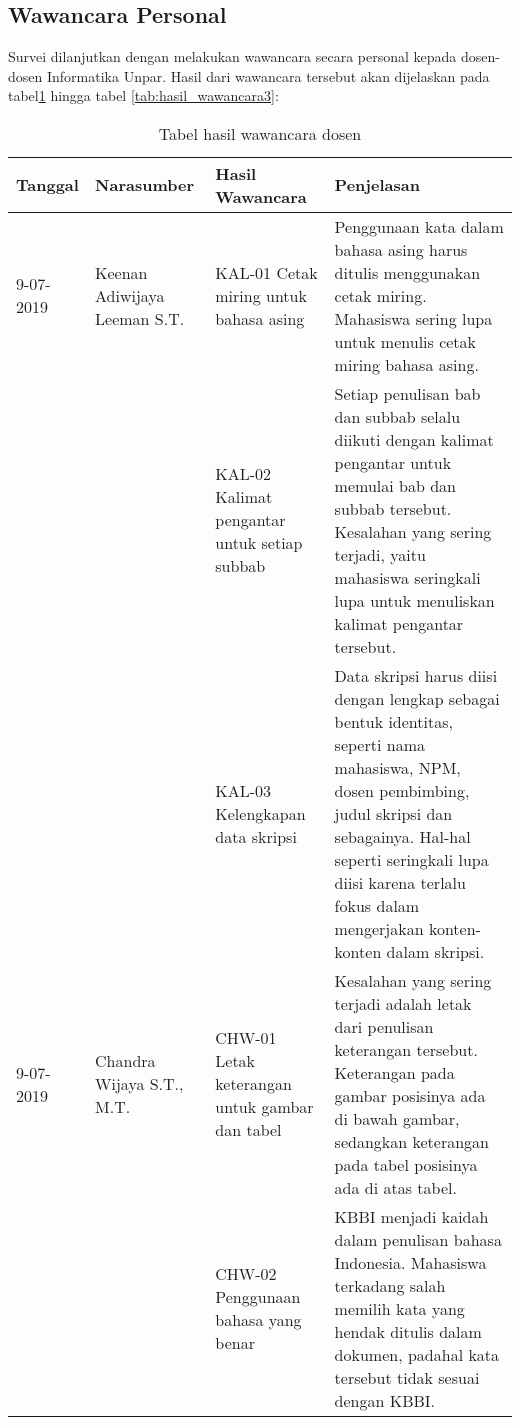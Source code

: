 \subsection{Wawancara Personal}
Survei dilanjutkan dengan melakukan wawancara secara personal kepada dosen-dosen Informatika Unpar. Hasil dari wawancara tersebut akan dijelaskan pada tabel\ref{tab:hasil_wawancara1} hingga tabel \ref{tab:hasil_wawancara3}:

\begin{table}[H]
	\caption {Tabel hasil wawancara dosen} \label{tab:hasil_wawancara1}
	\begin{center}
		\begin{tabular}{|p{2 cm}|>{\raggedright} p{3.5 cm}| p{4 cm}| p{5 cm}|}
		\hline
		Tanggal & Narasumber & Hasil Wawancara & Penjelasan \\ 
		\hline
		9-07-2019 & Keenan Adiwijaya Leeman S.T. & KAL-01 \newline Cetak miring untuk bahasa asing & Penggunaan kata dalam bahasa asing harus ditulis menggunakan cetak miring. Mahasiswa sering lupa untuk menulis cetak miring bahasa asing. \newline \\ 
		\hline
		 & & KAL-02 \newline Kalimat pengantar untuk setiap subbab & Setiap penulisan bab dan subbab selalu diikuti dengan kalimat pengantar untuk memulai bab dan subbab tersebut. Kesalahan yang sering terjadi, yaitu mahasiswa seringkali lupa untuk menuliskan kalimat pengantar tersebut. \newline \\ 
		\hline 
		 & & KAL-03 \newline Kelengkapan data skripsi & Data skripsi harus diisi dengan lengkap sebagai bentuk identitas, seperti nama mahasiswa, NPM, dosen pembimbing, judul skripsi dan sebagainya. Hal-hal seperti seringkali lupa diisi karena terlalu fokus dalam mengerjakan konten-konten dalam skripsi. \newline \\
		\hline
		9-07-2019 & Chandra Wijaya S.T., M.T. & CHW-01 \newline Letak keterangan untuk gambar dan tabel & Kesalahan yang sering terjadi adalah letak dari penulisan keterangan tersebut. Keterangan pada gambar posisinya ada di bawah gambar, sedangkan keterangan pada tabel posisinya ada di atas tabel. \newline \\ 
		\hline
		 & & CHW-02 \newline Penggunaan bahasa yang benar & KBBI menjadi kaidah dalam penulisan bahasa Indonesia. Mahasiswa terkadang salah memilih kata yang hendak ditulis dalam dokumen, padahal kata tersebut tidak sesuai dengan KBBI. \newline \\ 
		\hline
		\end{tabular}
	\end{center}
\end{table}

